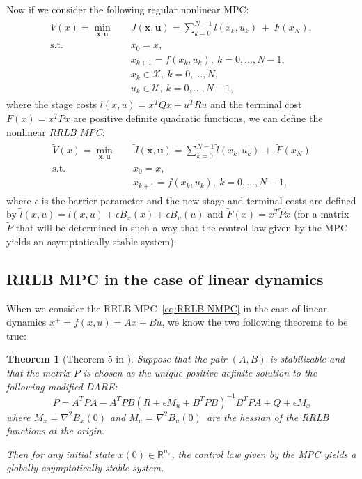 \documentclass[conference]{IEEEtran}
\newtheorem{theorem}{Theorem}[section]
\theoremstyle{definition}
\theoremstyle{remark}
\def\cal#1{\mathcal{#1}}
\def\bf#1{\mathbf{#1}}
\newcommand{\R}{\mathbb{R}}
\begin{document}
Now if we consider the following regular nonlinear MPC:
\begin{align}
	\begin{split}
		\label{eq:NMPC}
		V(x)=\underset{\bf{x},\bf{u}}{\min} &\quad J(\bf{x}, \bf{u})=\sum_{k=0}^{N-1}l(x_k,u_k)~+~F(x_N),\\
		\text{s.t.} &\quad x_0=x,\\
		&\quad x_{k+1}=f(x_k,u_k),~k=0,\ldots,N-1,\\
		&\quad x_k\in\cal{X},~k=0,\ldots,N,\\
		&\quad u_k\in\cal{U},~k=0,\ldots,N-1,
	\end{split}
\end{align}
where the stage costs $l(x,u)=x^TQx+u^TRu$ and the terminal cost $F(x)=x^TPx$ are positive definite quadratic functions, we can define the nonlinear \textit{RRLB MPC}:
\begin{align}
	\begin{split}\label{eq:RRLB-NMPC}
		\tilde{V}(x)=\underset{\bf{x},\bf{u}}{\min} &\quad \tilde{J}(\bf{x},\bf{u})=\sum_{k=0}^{N-1}\tilde{l}(x_k,u_k)~+~\tilde{F}(x_N)\\
		\text{s.t.} &\quad x_0=x,\\
		&\quad x_{k+1}=f(x_k,u_k),~k=0,\ldots,N-1,
	\end{split}
\end{align}
where $\epsilon$ is the barrier parameter and the new stage and terminal costs are defined by $\tilde{l}(x,u)=l(x,u)+\epsilon B_x(x)+\epsilon B_u(u)$ and $\tilde{F}(x)=x^T\tilde{P}x$ (for a matrix $\tilde{P}$ that will be determined in such a way that the control law given by the MPC yields an asymptotically stable system).

\subsection{RRLB MPC in the case of linear dynamics}

When we consider the RRLB MPC~\eqref{eq:RRLB-NMPC} in the case of linear dynamics $x^+=f(x,u)=Ax+Bu$, we know the two following theorems to be true:

\begin{theorem}[Theorem 5 in \cite{RRLB-linear-MPC}]
	\label{nominal-stability-linear-case}
	Suppose that the pair $(A,B)$ is stabilizable and that the matrix $P$ is chosen as the unique positive definite solution to the following modified DARE:
	\begin{equation}
		P=A^TPA-A^TPB(R+\epsilon M_u+B^TPB)^{-1}B^TPA+Q+\epsilon M_x
	\end{equation}
	where $M_x=\nabla^2 B_x(0)$ and $M_u=\nabla^2 B_u(0)$\, are the hessian of the RRLB functions at the origin.

	Then for any initial state $x(0)\in\R^{n_x}$, the control law given by the MPC yields a globally asymptotically stable system.
\end{theorem}
\end{document}

